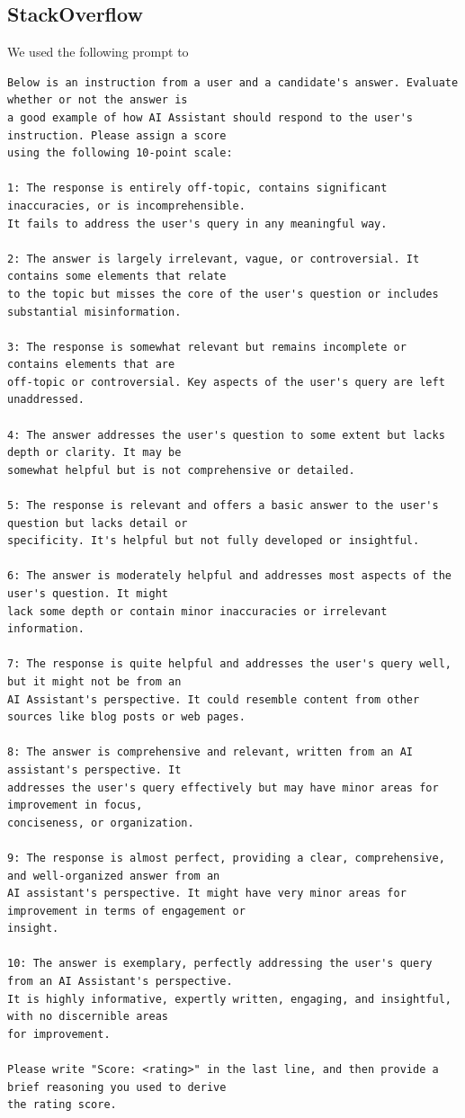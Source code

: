 \documentclass[10pt]{article} %
\begin{document}
\subsection{StackOverflow} \label{appendix:stackoverflow}
We used the following prompt to 
\begin{verbatim}
Below is an instruction from a user and a candidate's answer. Evaluate whether or not the answer is 
a good example of how AI Assistant should respond to the user's instruction. Please assign a score 
using the following 10-point scale:

1: The response is entirely off-topic, contains significant inaccuracies, or is incomprehensible. 
It fails to address the user's query in any meaningful way.

2: The answer is largely irrelevant, vague, or controversial. It contains some elements that relate 
to the topic but misses the core of the user's question or includes substantial misinformation.

3: The response is somewhat relevant but remains incomplete or contains elements that are 
off-topic or controversial. Key aspects of the user's query are left unaddressed.

4: The answer addresses the user's question to some extent but lacks depth or clarity. It may be 
somewhat helpful but is not comprehensive or detailed.

5: The response is relevant and offers a basic answer to the user's question but lacks detail or 
specificity. It's helpful but not fully developed or insightful.

6: The answer is moderately helpful and addresses most aspects of the user's question. It might 
lack some depth or contain minor inaccuracies or irrelevant information.

7: The response is quite helpful and addresses the user's query well, but it might not be from an 
AI Assistant's perspective. It could resemble content from other sources like blog posts or web pages.

8: The answer is comprehensive and relevant, written from an AI assistant's perspective. It 
addresses the user's query effectively but may have minor areas for improvement in focus, 
conciseness, or organization.

9: The response is almost perfect, providing a clear, comprehensive, and well-organized answer from an 
AI assistant's perspective. It might have very minor areas for improvement in terms of engagement or
insight.

10: The answer is exemplary, perfectly addressing the user's query from an AI Assistant's perspective. 
It is highly informative, expertly written, engaging, and insightful, with no discernible areas 
for improvement.

Please write "Score: <rating>" in the last line, and then provide a brief reasoning you used to derive 
the rating score.    
\end{verbatim}
\end{document}
